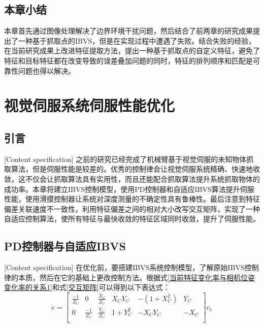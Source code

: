 \documentclass[fontset=fandol,type=bachelor,campus=harbin,bsmainpagenumberline=true]{hithesisbook}
\begin{document}
\section{本章小结}
本章首先通过图像处理解决了边界环境干扰问题，然后结合了前两章的研究成果提出了一种基于抓取点的IBVS，但是在实现过程中遭遇了失败。结合失败的经验，在当前研究成果上改进特征提取方法，提出一种基于抓取点的自定义特征，避免了特征和目标特征都在改变导致的误差叠加问题的同时，特征的排列顺序和匹配是可靠性问题也得以解决。



\chapter[视觉伺服系统伺服性能优化]{视觉伺服系统伺服性能优化}
\section{引言}[Content specification]
之前的研究已经完成了机械臂基于视觉伺服的未知物体抓取算法，但是伺服性能是较差的。优秀的控制律会让视觉伺服系统精确、快速地收敛，这不仅会让抓取算法具有实用性，而且还能配合抓取算法提升系统抓取物体的成功率。本章将建立IBVS控制模型，使用PD控制器和自适应IBVS算法\cite{mansard2007task}提升伺服性能，使用滑摸控制器让系统对深度测量的不确定性具有鲁棒性。最后注意到特征偏差关联速度不一致性，利用特征偏差之间的相对大小改写交互矩阵，实现了一种自适应控制算法，使所有特征与最快收敛的特征区域同时收敛，提升了伺服性能。


\section{PD控制器与自适应IBVS}[Content specification]
在优化前，要搭建IBVS系统控制模型，了解原始IBVS控制律的本质，然后在它的基础上更改控制方法。根据式\ref{当前特征变化率与相机位姿变化率的关系1}和式\ref{交互矩阵}可以得到以下表达式：
\begin{equation}
\dot{e}=\left[ \begin{matrix}
	\frac{-1}{Z_C}&		0&		\frac{X_C}{Z_C}&		X_CY_C&		-\left( 1+X_{C}^{2} \right)&		Y_C\\
	0&		\frac{-1}{Z_C}&		\frac{Y_C}{Z_C}&		1+Y_{C}^{2}&		-X_CY_C&		-X_C\\
\end{matrix} \right] v_c
\label{IBVS展开式}
\end{equation}
\end{document}
